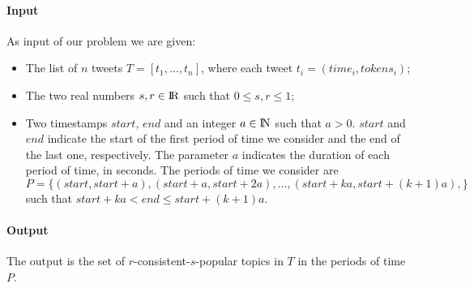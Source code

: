\paragraph{Input}
As input of our problem we are given:
\begin{itemize}
    \item The list of $n$ tweets 
$T = [\mathit{t}_1, \dots, \mathit{t}_n]$, where each tweet
$\mathit{t}_i = (\mathit{time}_i, \mathit{tokens}_i)$;
    \item The two real numbers $s, r \in \rm I\!R$
    such that $0 \leq s, r \leq 1$;
    \item Two timestamps $\mathit{start}$, $\mathit{end}$ and an integer $a \in \rm I\!N$
    such that $a > 0$.
    $\mathit{start}$ and $\mathit{end}$ indicate the start of the first period 
    of time we consider and the end of the last one, respectively. The parameter
    $a$ indicates the duration of each period of time, in seconds.
    The periods of time we consider are
    $P = \{(\mathit{start}, \mathit{start} + a), (\mathit{start} + a, \mathit{start} + 2a), 
    \dots , (\mathit{start} + ka, \mathit{start} + (k+1)a),\}$
    such that $\mathit{start} + ka < \mathit{end} \leq start + (k+1)a$. 
\end{itemize}

\paragraph{Output}

The output is the set of $r$-consistent-$s$-popular topics in $T$ in 
the periods of time $P$.
